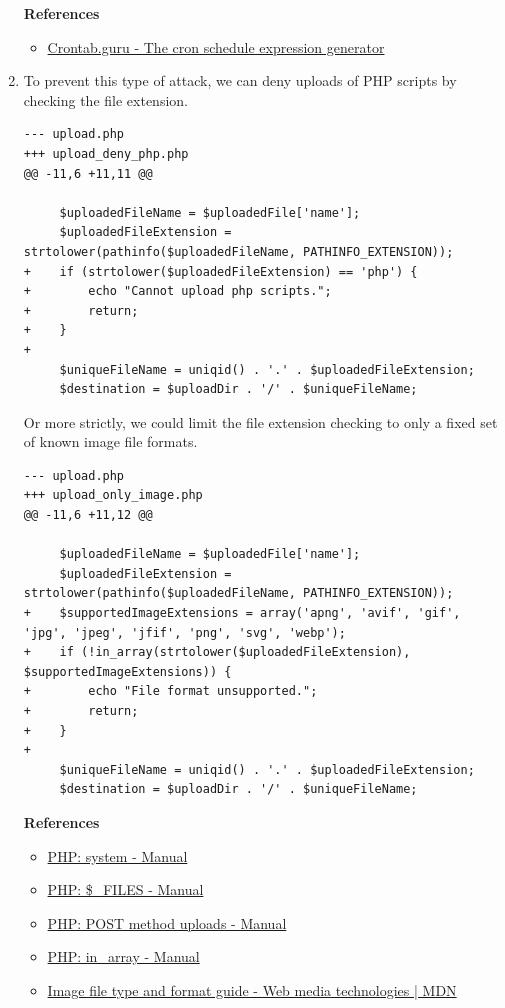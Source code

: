 \documentclass[12pt, a4paper]{article}
\begin{document}
\begin{enumerate}[label=(\alph*)]
    \textbf{References}
    \begin{itemize}
      \item \href{https://crontab.guru/#0_*_*_*_*}{Crontab.guru - The cron schedule expression generator}
    \end{itemize}

    \pagebreak
    \item To prevent this type of attack, we can deny uploads of PHP scripts by
    checking the file extension.
    \begin{verbatim}
--- upload.php
+++ upload_deny_php.php
@@ -11,6 +11,11 @@

     $uploadedFileName = $uploadedFile['name'];
     $uploadedFileExtension = strtolower(pathinfo($uploadedFileName, PATHINFO_EXTENSION));
+    if (strtolower($uploadedFileExtension) == 'php') {
+        echo "Cannot upload php scripts.";
+        return;
+    }
+
     $uniqueFileName = uniqid() . '.' . $uploadedFileExtension;
     $destination = $uploadDir . '/' . $uniqueFileName;
    \end{verbatim}

    Or more strictly, we could limit the file extension checking to only a fixed
    set of known image file formats.
    \begin{verbatim}
--- upload.php
+++ upload_only_image.php
@@ -11,6 +11,12 @@

     $uploadedFileName = $uploadedFile['name'];
     $uploadedFileExtension = strtolower(pathinfo($uploadedFileName, PATHINFO_EXTENSION));
+    $supportedImageExtensions = array('apng', 'avif', 'gif', 'jpg', 'jpeg', 'jfif', 'png', 'svg', 'webp');
+    if (!in_array(strtolower($uploadedFileExtension), $supportedImageExtensions)) {
+        echo "File format unsupported.";
+        return;
+    }
+
     $uniqueFileName = uniqid() . '.' . $uploadedFileExtension;
     $destination = $uploadDir . '/' . $uniqueFileName;
    \end{verbatim}

    \textbf{References}
    \begin{itemize}
      \item \href{https://www.php.net/manual/en/function.system.php}{PHP: system - Manual}
      \item \href{https://www.php.net/manual/en/reserved.variables.files.php}{PHP: \$\_FILES - Manual}
      \item \href{https://www.php.net/manual/en/features.file-upload.post-method.php}{PHP: POST method uploads - Manual}
      \item \href{https://www.php.net/manual/en/function.in-array.php}{PHP: in\_array - Manual}
      \item \href{https://developer.mozilla.org/en-US/docs/Web/Media/Formats/Image_types}{Image file type and format guide - Web media technologies | MDN}
    \end{itemize}


\end{enumerate}
\end{document}
